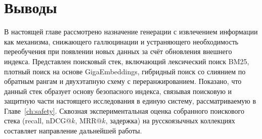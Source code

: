 \section{Выводы}\label{sec:rag_conclusions}

В настоящей главе рассмотрено назначение генерации с извлечением информации как механизма, снижающего галлюцинации и устраняющего необходимость переобучения при появлении новых данных за счёт обновления внешнего индекса.
Представлен поисковый стек, включающий лексический поиск BM25, плотный поиск на основе GigaEmbeddings, гибридный поиск со слиянием по обратным рангам и двухэтапную схему с переранжированием.
Показано, что данный стек образует основу безопасного индекса, связывая поисковую и защитную части настоящего исследования в единую систему, рассматриваемую в Главе~\ref{ch:safety}.
Сквозная экспериментальная оценка собранного поискового стека (recall, nDCG@$k$, MRR@$k$, задержка) на русскоязычных коллекциях составляет направление дальнейшей работы.
